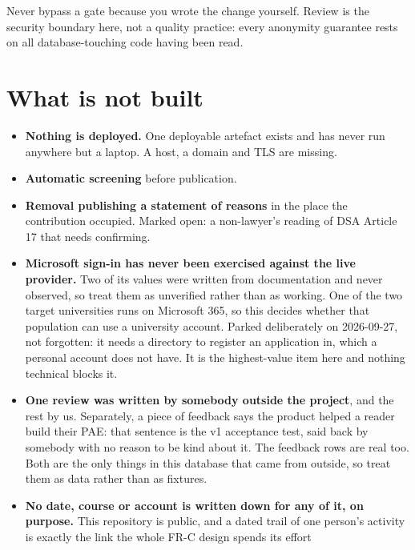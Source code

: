 \documentclass[11pt,a4paper]{article}
\begin{document}
\begin{careful}
Never bypass a gate because you wrote the change yourself. Review is the
security boundary here, not a quality practice: every anonymity guarantee rests
on all database-touching code having been read.
\end{careful}

\section{What is not built}

\begin{itemize}[leftmargin=*]
  \item \textbf{Nothing is deployed.} One deployable artefact exists and has
        never run anywhere but a laptop. A host, a domain and TLS are missing.
  \item \textbf{Automatic screening} before publication.
  \item \textbf{Removal publishing a statement of reasons} in the place the
        contribution occupied. Marked open: a non-lawyer's reading of DSA
        Article 17 that needs confirming.
  \item \textbf{Microsoft sign-in has never been exercised against the live
        provider.} Two of its values were written from documentation and never
        observed, so treat them as unverified rather than as working. One of
        the two target universities runs on Microsoft 365, so this decides
        whether that population can use a university account. Parked
        deliberately on 2026-09-27, not forgotten: it needs a directory to
        register an application in, which a personal account does not have. It
        is the highest-value item here and nothing technical blocks it.
  \item \textbf{One review was written by somebody outside the project}, and
        the rest by us. Separately, a piece of feedback says the product helped
        a reader build their PAE: that sentence is the v1 acceptance test, said
        back by somebody with no reason to be kind about it. The feedback rows
        are real too. Both are the only things in this database that came from
        outside, so treat them as data rather than as fixtures.
  \item \textbf{No date, course or account is written down for any of it, on
        purpose.} This repository is public, and a dated trail of one person's
        activity is exactly the link the whole FR-C design spends its effort

\end{itemize}
\end{document}
